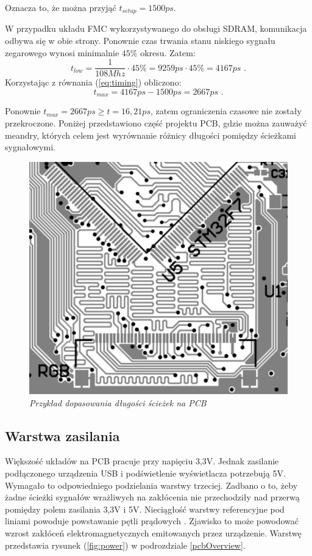 \documentclass[eng,printmode]{mgr}
\begin{document}
\noindent
Oznacza to, że można przyjąć $t_{setup}=1500ps$.

W przypadku układu FMC wykorzystywanego do obsługi SDRAM, komunikacja odbywa się w obie strony. Ponownie czas trwania stanu niskiego sygnału zegarowego wynosi minimalnie $45\%$ okresu. Zatem:
$$
t_{low} = \frac{1}{108Mhz} \cdot 45\% = 9259ps\cdot45\% = 4167ps \textrm{ .}
$$
Korzystając z równania (\ref{eq:timing}) obliczono:
$$
t_{max} = 4167ps - 1500ps = 2667ps\textrm{ .}
$$

Ponownie $t_{max}= 2667ps \geq t=16,21ps$, zatem ograniczenia czasowe nie zostały przekroczone.
Poniżej przedstawiono część projektu PCB, gdzie można zauważyć meandry, których celem jest wyrównanie różnicy długości pomiędzy ścieżkami sygnałowymi.

\begin{figure}[!h]
    \centering
    \includegraphics[width=13cm]{pcb/ltdc.png}
    \caption{\textit{Przykład dopasowania długości ścieżek na PCB}}
\end{figure}

\subsection*{Warstwa zasilania}
Większość układów na PCB pracuje przy napięciu 3,3V. Jednak zasilanie podłączonego urządzenia USB i podświetlenie wyświetlacza potrzebują 5V. Wymagało to odpowiedniego podzielania warstwy trzeciej. Zadbano o to, żeby żadne ścieżki sygnałów wrażliwych na zakłócenia nie przechodziły nad przerwą pomiędzy polem zasilania 3,3V i 5V. Nieciągłość warstwy referencyjne pod liniami powoduje powstawanie pętli prądowych \cite{highSpeedDesign}. Zjawisko to może powodować wzrost zakłóceń elektromagnetycznych emitowanych przez urządzenie. Warstwę przedstawia rysunek (\ref{fig:power}) w podrozdziale \ref{pcbOverview}.
\end{document}
